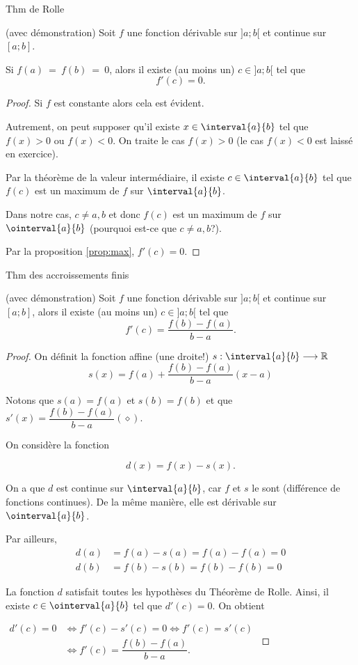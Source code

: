 \begin{thm}
	Thm de Rolle

	(avec démonstration)
	\tcblower
	Soit $f$ une fonction dérivable sur $] a;b[$ et continue sur $[a;b]$. 

	Si $f(a)~=~f(b)~=~0$, alors il existe (au moins un) $c\in] a;b[$ tel que 
	\[f'(c)=0.\]
	\begin{proof}
		Si $f$ est constante alors cela est évident.

		Autrement, on peut supposer qu'il existe $x\in \interval{a}{b}$ tel que $f(x)>0$ ou $f(x)<0$. On traite le cas $f(x)>0$ (le cas $f(x)<0$ est laissé en exercice).  

Par la théorème de la valeur intermédiaire, il existe $c\in \interval{a}{b}$ tel que $f(c)$ est un maximum de $f$ sur $\interval{a}{b}$. 

Dans notre cas, $c\neq a,b$ et donc $f(c)$ est un maximum de $f$ sur $\ointerval{a}{b}$ (pourquoi est-ce que $c\neq a,b$?).

Par la proposition \ref{prop:max}, $f'(c)=0$.  
	\end{proof}
\end{thm}
\begin{thm}
	Thm des accroissements finis

	(avec démonstration)
	\tcblower
	Soit $f$ une fonction dérivable sur $] a;b[$ et continue sur $[a;b]$, alors il existe (au moins un) $c\in ]a;b[$ tel que 
	\[f'(c)=\dfrac{f(b)-f(a)}{b-a}.\]
	
	\begin{proof}
		On définit la fonction affine (une droite!) $s:\interval{a}{b}\longrightarrow \mathbb{R}$ 
		\[s(x)=f(a)+\dfrac{f(b)-f(a)}{b-a}(x-a)\]

		Notons que $s(a)=f(a)$ et $s(b)=f(b)$ et que $s'(x)=\dfrac{f(b)-f(a)}{b-a} (\diamond)$.

	On considère la fonction 

	\[d(x)=f(x)-s(x).\]

	On a que $d$ est continue sur $\interval{a}{b}$, car $f$ et $s$ le sont (différence de fonctions continues). De la même manière, elle est dérivable sur $\ointerval{a}{b}$.  

	Par ailleurs, 
	\begin{align*}
		d(a)&=f(a)-s(a)=f(a)-f(a)=0\\
		d(b)&=f(b)-s(b)=f(b)-f(b)=0
	\end{align*}

	La fonction $d$ satisfait toutes les hypothèses du Théorème de Rolle. Ainsi, il existe $c\in \ointerval{a}{b}$ tel que $d'(c)=0$. On obtient
	
	$\begin{aligned}d'(c)=0 &\iff f'(c)-s'(c)=0\iff f'(c)=s'(c)\\
	&\iff f'(c)=\dfrac{f(b)-f(a)}{b-a}.
	\end{aligned}$

	\end{proof}
\end{thm}
